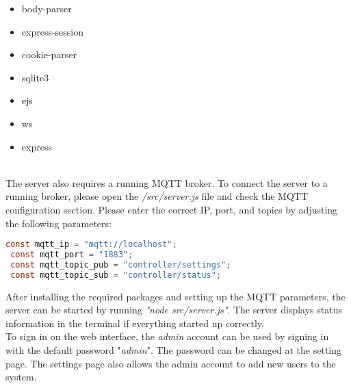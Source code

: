 \begin{minipage}[t]{.1\textwidth} 
\end{minipage}%
\begin{minipage}[t]{.25\textwidth}
    \begin{itemize}\itemsep0pt
        \item body-parser
        \item express-session
    \end{itemize}   
\end{minipage}%
\begin{minipage}[t]{.25\textwidth}
        \begin{itemize}\itemsep0pt
        \item cookie-parser
        \item sqlite3
    \end{itemize}
\end{minipage}%
\begin{minipage}[t]{.15\textwidth}
        \begin{itemize}\itemsep0pt
        \item ejs
        \item ws
    \end{itemize}
\end{minipage}%
\begin{minipage}[t]{.25\textwidth}
        \begin{itemize}\itemsep0pt
        \item express
    \end{itemize}
\end{minipage}%
\\

The server also requires a running MQTT broker. To connect the server to a running broker, please open the \textit{/src/server.js} file and check the MQTT configuration section. Please enter the correct IP, port, and topics by adjusting the following parameters:

\begin{lstlisting}[language = Java, numbers = none]
 const mqtt_ip = "mqtt://localhost";
 const mqtt_port = "1883";
 const mqtt_topic_pub = "controller/settings";
 const mqtt_topic_sub = "controller/status";
\end{lstlisting}

After installing the required packages and setting up the MQTT parameters, the server can be started by running \textit{"node src/server.js"}. The server displays status information in the terminal if everything started up correctly.\\

To sign in on the web interface, the \textit{admin} account can be used by signing in with the default password "\textit{admin}". The password can be changed at the setting page. The settings page also allows the admin account to add new users to the system.